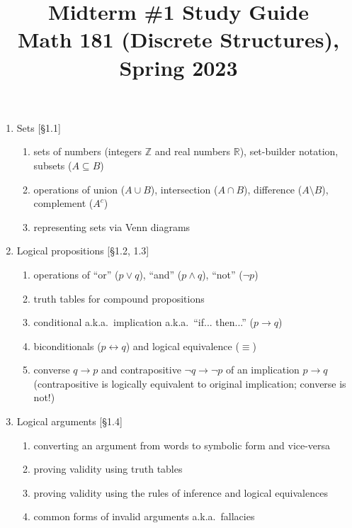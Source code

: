 \documentclass[11pt]{article}
\title{Midterm \#1 Study Guide \\Math 181 (Discrete Structures), Spring 2023}
\date{}
\begin{document}
\maketitle

\thispagestyle{empty}

\vspace{-1cm}

\begin{enumerate}
\item Sets [\S1.1] 
\begin{enumerate}
\item sets of numbers (integers $\mathbb{Z}$ and real numbers $\mathbb{R}$), set-builder notation, subsets ($A \subseteq B$)
\item operations of union ($A \cup B$), intersection ($A \cap B$), difference ($A \setminus B$), complement ($A^c$)
\item representing sets via Venn diagrams
\end{enumerate}

\item Logical propositions [\S1.2, 1.3]
\begin{enumerate}
\item operations of ``or'' ($p \vee q$), ``and'' ($p \wedge q$), ``not'' ($\neg p$)
\item truth tables for compound propositions 
\item conditional a.k.a.~implication a.k.a.~``if... then...'' ($p \to q$)
\item biconditionals ($p \leftrightarrow q$) and logical equivalence ($\equiv$)
\item converse $q \to p$ and contrapositive $\neg q \to \neg p$ of an implication $p\to q$ \\
(contrapositive is logically equivalent to original implication; converse is not!)
\end{enumerate}

\item Logical arguments [\S1.4]
\begin{enumerate}
\item converting an argument from words to symbolic form and vice-versa
\item proving validity using truth tables
\item proving validity using the rules of inference and logical equivalences
\item common forms of invalid arguments a.k.a.~fallacies
\end{enumerate}


\end{enumerate}
\end{document}
